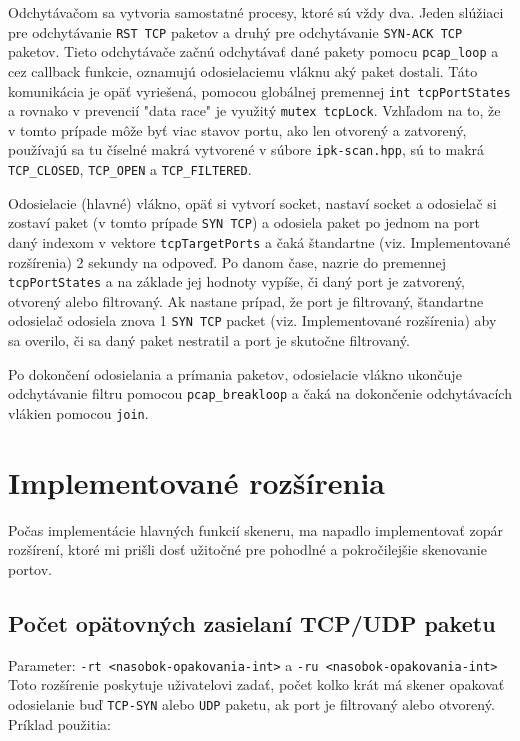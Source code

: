 \documentclass[titlepage]{article}
\begin{document}
Odchytávačom sa vytvoria samostatné procesy, ktoré sú vždy dva. Jeden slúžiaci pre odchytávanie \verb|RST TCP| paketov a druhý pre odchytávanie \verb|SYN-ACK TCP| paketov. Tieto odchytávače začnú odchytávať dané pakety pomocu \verb|pcap_loop| a cez callback funkcie, oznamujú odosielaciemu vláknu aký paket dostali. Táto komunikácia je opäť vyriešená, pomocou globálnej premennej \verb|int tcpPortStates| a rovnako v prevencií "data race" je využitý \verb|mutex tcpLock|. Vzhľadom na to, že v tomto prípade môže byť viac stavov portu, ako len otvorený a zatvorený, používajú sa tu číselné makrá vytvorené v súbore \verb|ipk-scan.hpp|, sú to makrá \verb|TCP_CLOSED|, \verb|TCP_OPEN| a \verb|TCP_FILTERED|. \par 
Odosielacie (hlavné) vlákno, opäť si vytvorí socket, nastaví socket a odosielač si zostaví paket (v tomto prípade \verb|SYN TCP|) a odosiela paket po jednom na port daný indexom v vektore \verb|tcpTargetPorts| a čaká štandartne (viz. Implementované rozšírenia) 2 sekundy na odpoveď. Po danom čase, nazrie do premennej \verb|tcpPortStates| a na základe jej hodnoty vypíše, či daný port je zatvorený, otvorený  alebo filtrovaný. Ak nastane prípad, že port je filtrovaný, štandartne odosielač odosiela znova 1 \verb|SYN TCP| packet (viz. Implementované rozšírenia) aby sa overilo, či sa daný paket nestratil a port je skutočne filtrovaný. \par 
Po dokončení odosielania a prímania paketov, odosielacie vlákno ukončuje odchytávanie filtru pomocou \verb|pcap_breakloop| a čaká na dokončenie odchytávacích vlákien pomocou \verb|join|.

\newpage
\section{Implementované rozšírenia}
Počas implementácie hlavných funkcií skeneru, ma napadlo implementovať zopár rozšírení, ktoré mi prišli dosť užitočné pre pohodlné a pokročilejšie skenovanie portov.

\subsection{Počet opätovných zasielaní TCP/UDP paketu}
Parameter: \verb|-rt <nasobok-opakovania-int>| a \verb|-ru <nasobok-opakovania-int>|\newline \newline
Toto rozšírenie poskytuje uživatelovi zadať, počet kolko krát má skener opakovať odosielanie buď \verb|TCP-SYN| alebo \verb|UDP| paketu, ak port je filtrovaný alebo otvorený.\newline
Príklad použitia:\newline
\end{document}

